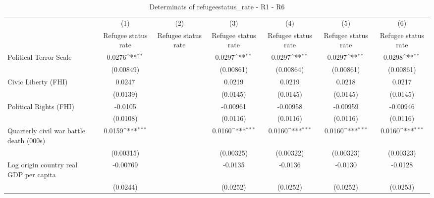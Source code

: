 \begin{table}[htbp]\centering
\def\sym#1{\ifmmode^{#1}\else\(^{#1}\)\fi}
\caption{Determinats of refugeestatus\_rate - R1 - R6}
\begin{tabular}{l*{6}{c}}
\hline\hline
                    &\multicolumn{1}{c}{(1)}&\multicolumn{1}{c}{(2)}&\multicolumn{1}{c}{(3)}&\multicolumn{1}{c}{(4)}&\multicolumn{1}{c}{(5)}&\multicolumn{1}{c}{(6)}\\
                    &\multicolumn{1}{c}{Refugee status rate}&\multicolumn{1}{c}{Refugee status rate}&\multicolumn{1}{c}{Refugee status rate}&\multicolumn{1}{c}{Refugee status rate}&\multicolumn{1}{c}{Refugee status rate}&\multicolumn{1}{c}{Refugee status rate}\\
\hline
Political Terror Scale&      0.0276\sym{**} &                     &      0.0297\sym{**} &      0.0297\sym{**} &      0.0297\sym{**} &      0.0298\sym{**} \\
                    &   (0.00849)         &                     &   (0.00861)         &   (0.00864)         &   (0.00861)         &   (0.00861)         \\
[1em]
Civic Liberty (FHI) &      0.0247         &                     &      0.0219         &      0.0219         &      0.0218         &      0.0217         \\
                    &    (0.0139)         &                     &    (0.0145)         &    (0.0145)         &    (0.0145)         &    (0.0145)         \\
[1em]
Political Rights (FHI)&     -0.0105         &                     &    -0.00961         &    -0.00958         &    -0.00959         &    -0.00946         \\
                    &    (0.0108)         &                     &    (0.0116)         &    (0.0116)         &    (0.0116)         &    (0.0116)         \\
[1em]
Quarterly civil war battle death (000s)&      0.0159\sym{***}&                     &      0.0160\sym{***}&      0.0160\sym{***}&      0.0160\sym{***}&      0.0160\sym{***}\\
                    &   (0.00315)         &                     &   (0.00325)         &   (0.00322)         &   (0.00323)         &   (0.00323)         \\
[1em]
Log origin country real GDP per capita&    -0.00769         &                     &     -0.0135         &     -0.0136         &     -0.0130         &     -0.0128         \\
                    &    (0.0244)         &                     &    (0.0252)         &    (0.0252)         &    (0.0252)         &    (0.0253)         \\

\end{tabular}
\end{table}
